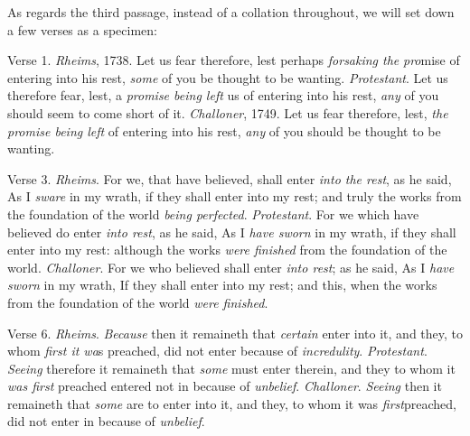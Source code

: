 As regards the third passage, instead of a collation throughout, we
will set down a few verses as a specimen:

Verse 1.
\emph{Rheims}, 1738. Let us fear therefore, lest perhaps \emph{forsaking
the} \emph{pro}mise of entering into his rest, \emph{some} of you
be thought to be wanting.
\emph{Protestant}. Let us therefore fear, lest, a \emph{promise being
left} us of entering into his rest, \emph{any} of you should seem
to come short of it.
\emph{Challoner}, 1749. Let us fear therefore, lest, \emph{the promise
being left} of entering into his rest, \emph{any} of you should be
thought to be wanting.

Verse 3.
\emph{Rheims}. For we, that have believed, shall enter \emph{into the
rest}, as he said, As I \emph{sware} in my wrath, if they shall
enter into my rest; and truly the works from the foundation of the
world \emph{being perfected}.
\emph{Protestant}. For we which have believed do enter \emph{into rest},
as he said, As I \emph{have sworn} in my wrath, if they shall enter
into my rest: although the works \emph{were finished} from the
foundation of the world.
\emph{Challoner}. For we who believed shall enter \emph{into rest}; as
he said, As I \emph{have sworn} in my wrath, If they shall enter into
my rest; and this, when the works from the foundation of the world \emph{were
finished}.

Verse 6.
\emph{Rheims}. \emph{Because} then it remaineth that \emph{certain}
enter into it, and they, to whom \emph{first it wa}s preached, did not
enter because of \emph{incredulity}.
\emph{Protestant}. \emph{Seeing} therefore it remaineth that \emph{some}
must enter therein, and they to whom it \emph{was first} preached
entered not in because of \emph{unbelief}.
\emph{Challoner}. \emph{Seeing} then it remaineth that \emph{some} are
to enter into it, and they, to whom it was \emph{first}preached, did
not enter in because of \emph{unbelief}.


